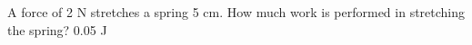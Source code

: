 {A force of 2 N stretches a spring 5 cm. How much work is performed in stretching the spring?}
{0.05 J}
